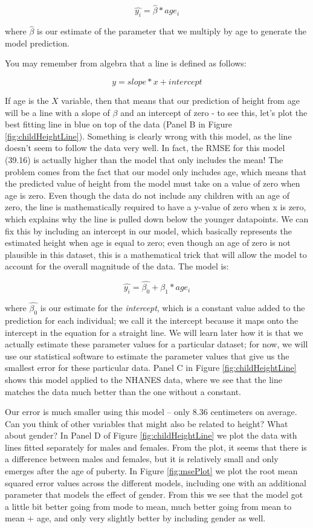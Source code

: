 \documentclass[
  12pt,
]{book}
\begin{document}
\[
\hat{y_i} =  \hat{\beta} * age_i
\]

where \(\hat{\beta}\) is our estimate of the parameter that we multiply by age to generate the model prediction.

You may remember from algebra that a line is defined as follows:

\[
y = slope*x + intercept
\]

If age is the \(X\) variable, then that means that our prediction of height from age will be a line with a slope of \(\beta\) and an intercept of zero - to see this, let's plot the best fitting line in blue on top of the data (Panel B in Figure \ref{fig:childHeightLine}). Something is clearly wrong with this model, as the line doesn't seem to follow the data very well. In fact, the RMSE for this model (39.16) is actually higher than the model that only includes the mean! The problem comes from the fact that our model only includes age, which means that the predicted value of height from the model must take on a value of zero when age is zero. Even though the data do not include any children with an age of zero, the line is mathematically required to have a y-value of zero when x is zero, which explains why the line is pulled down below the younger datapoints. We can fix this by including an intercept in our model, which basically represents the estimated height when age is equal to zero; even though an age of zero is not plausible in this dataset, this is a mathematical trick that will allow the model to account for the overall magnitude of the data. The model is:

\[
\widehat{y_i} = \hat{\beta_0} + \hat{\beta_1} * age_i
\]

where \(\hat{\beta_0}\) is our estimate for the \emph{intercept}, which is a constant value added to the prediction for each individual; we call it the intercept because it maps onto the intercept in the equation for a straight line. We will learn later how it is that we actually estimate these parameter values for a particular dataset; for now, we will use our statistical software to estimate the parameter values that give us the smallest error for these particular data. Panel C in Figure \ref{fig:childHeightLine} shows this model applied to the NHANES data, where we see that the line matches the data much better than the one without a constant.

Our error is much smaller using this model -- only 8.36 centimeters on average. Can you think of other variables that might also be related to height? What about gender? In Panel D of Figure \ref{fig:childHeightLine} we plot the data with lines fitted separately for males and females. From the plot, it seems that there is a difference between males and females, but it is relatively small and only emerges after the age of puberty. In Figure \ref{fig:msePlot} we plot the root mean squared error values across the different models, including one with an additional parameter that models the effect of gender. From this we see that the model got a little bit better going from mode to mean, much better going from mean to mean + age, and only very slightly better by including gender as well.
\end{document}
